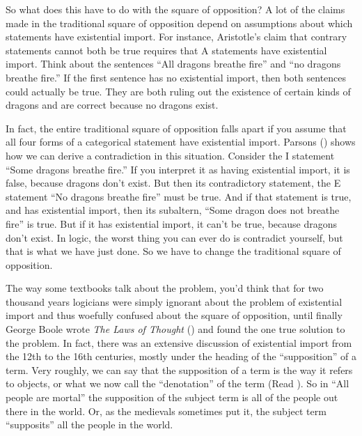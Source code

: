 So what does this have to do with the square of opposition? A lot of the claims made in the traditional square of opposition depend on assumptions about which statements have existential import. For instance, Aristotle's claim that contrary statements cannot both be true requires that A statements have existential import. Think about the sentences ``All dragons breathe fire'' and ``no dragons breathe fire.'' If the first sentence has no existential import, then both sentences could actually be true. They are both ruling out the existence of certain kinds of dragons and are correct because no dragons exist.

In fact, the entire traditional square of opposition falls apart if you assume that all four forms of a categorical statement have existential import. Parsons (\cite*{Parsons1997}) shows how we can derive a contradiction in this situation. Consider the I statement ``Some dragons breathe fire.'' If you interpret it as having existential import, it is false, because dragons don't exist. But then its contradictory statement, the E statement ``No dragons breathe fire'' must be true. And if that statement is true, and has existential import, then its subaltern, ``Some dragon does not breathe fire'' is true. But if it has existential import, it can't be true, because dragons don't exist. In logic, the worst thing you can ever do is contradict yourself, but that is what we have just done. So we have to change the traditional square of opposition.

 The way some textbooks talk about the problem, you'd think that for two thousand years logicians were simply ignorant about the problem of existential import and thus woefully confused about the square of opposition, until finally George Boole wrote \textit{The Laws of Thought} (\cite*{Boole1854}) and found the one true solution to the problem. In fact, there was an extensive discussion of existential import from the 12th to the 16th centuries, mostly under the heading of the ``supposition'' of a term. Very roughly, we can say that the supposition of a term is the way it refers to objects, or what we now call the ``denotation'' of the term (Read \cite*{Read2002}).  So in ``All people are mortal'' the supposition of the subject term is all of the people out there in the world. Or, as the medievals sometimes put it, the subject term ``supposits'' all the people in the world.

